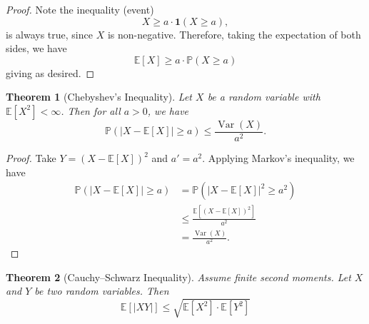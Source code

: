 \documentclass[11pt]{article}
\numberwithin{equation}{section}
\newtheorem{theorem}{Theorem}[section]
\theoremstyle{definition}
\theoremstyle{remark}
\newcommand{\pqty}[1]{\left(#1\right)}
\newcommand{\bqty}[1]{\left[#1\right]}
\newcommand{\abs}[1]{\left|#1\right|}
\newcommand{\indicator}{\mathbf 1}
\newcommand{\Prob}{\mathbb P}
\newcommand{\Expt}{\mathbb E}
\DeclareMathOperator{\Var}{Var}
\begin{document}
\begin{proof}\label{probability-proof-027}
    Note the inequality (event)
    \[
        X \geq a \cdot \indicator\pqty{X \geq a},
    \]
    is always true, since \(X\) is non-negative. Therefore, taking the expectation of both sides, we have
    \[
        \Expt\bqty{X} \geq a \cdot \Prob\pqty{X \geq a}
    \]
    giving as desired.
\end{proof}

\begin{theorem}[Chebyshev's Inequality]\label{probability-theorem-006}
    \label{probability-thm:chebyshev-inequality}%
    Let \(X\) be a random variable with \(\Expt\bqty{X^2} < \infty\). Then for all \(a > 0\), we have
    \[
        \Prob\pqty{\abs{X - \Expt\bqty{X}} \geq a} \leq \frac{\Var\pqty{X}}{a^2}.
    \]
\end{theorem}

\begin{proof}\label{probability-proof-028}
    Take \(Y = \pqty{X - \Expt\bqty{X}}^2\) and \(a' = a^2\). Applying Markov's inequality, we have
    \begin{align*}
        \Prob\pqty{\abs{X - \Expt\bqty{X}} \geq a} &= \Prob\pqty{\abs{X - \Expt\bqty{X}}^2 \geq a^2} \\
        &\leq \frac{\Expt\bqty{\pqty{X - \Expt\bqty{X}}^2}}{a^2} \\
        &= \frac{\Var\pqty{X}}{a^2}.
    \end{align*}
\end{proof}

\begin{theorem}[Cauchy--Schwarz Inequality]\label{probability-theorem-007}
    \label{probability-thm:cauchy-schwartz-inequality}%
Assume finite second moments.
    Let \(X\) and \(Y\) be two random variables. Then
    \[
        \Expt\bqty{\abs{XY}} \leq \sqrt{\Expt\bqty{X^2} \cdot \Expt\bqty{Y^2}}
    \]
\end{theorem}
\end{document}
